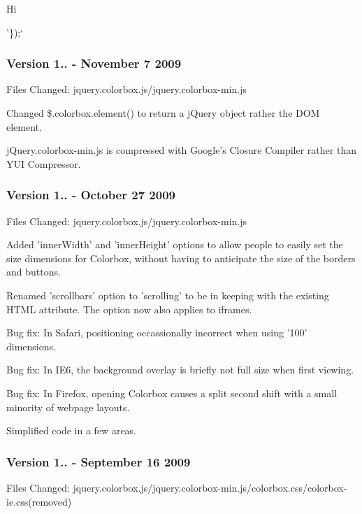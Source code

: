Hi

'\});`

\subsubsection*{Version 1.. -\/ November 7 2009}

Files Changed\-: jquery.\-colorbox.\-js/jquery.colorbox-\/min.\-js


\begin{DoxyItemize}
\item Changed \$.colorbox.\-element() to return a j\-Query object rather the D\-O\-M element.
\item j\-Query.\-colorbox-\/min.\-js is compressed with Google's Closure Compiler rather than Y\-U\-I Compressor.
\end{DoxyItemize}

\subsubsection*{Version 1.. -\/ October 27 2009}

Files Changed\-: jquery.\-colorbox.\-js/jquery.colorbox-\/min.\-js


\begin{DoxyItemize}
\item Added 'inner\-Width' and 'inner\-Height' options to allow people to easily set the size dimensions for Colorbox, without having to anticipate the size of the borders and buttons.
\item Renamed 'scrollbars' option to 'scrolling' to be in keeping with the existing H\-T\-M\-L attribute. The option now also applies to iframes.
\item Bug fix\-: In Safari, positioning occassionally incorrect when using '100' dimensions.
\item Bug fix\-: In I\-E6, the background overlay is briefly not full size when first viewing.
\item Bug fix\-: In Firefox, opening Colorbox causes a split second shift with a small minority of webpage layouts.
\item Simplified code in a few areas.
\end{DoxyItemize}

\subsubsection*{Version 1.. -\/ September 16 2009}

Files Changed\-: jquery.\-colorbox.\-js/jquery.colorbox-\/min.\-js/colorbox.css/colorbox-\/ie.\-css(removed)


